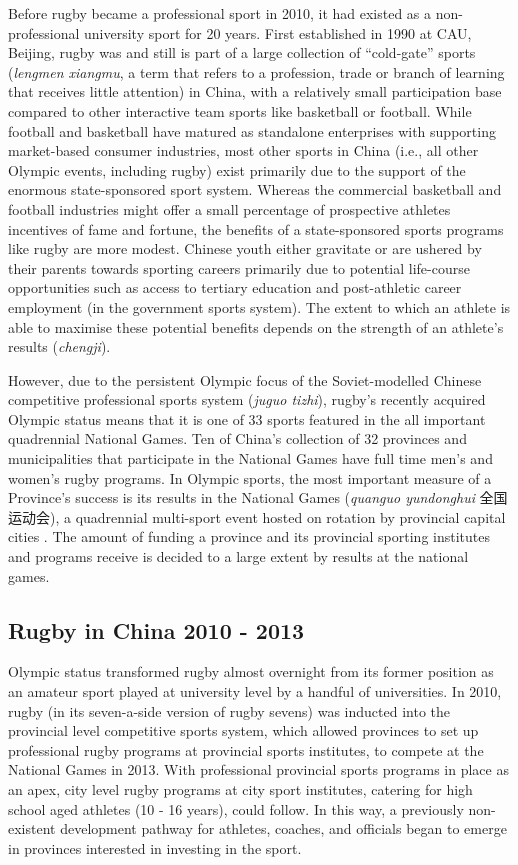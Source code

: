 {Before rugby became a professional sport in 2010, it had existed as a non-professional university sport for 20 years.  First established in 1990 at CAU, Beijing, rugby was and still is part of a large collection of ``cold-gate'' sports (\textit{lengmen xiangmu}, a term that refers to a profession, trade or branch of learning that receives little attention) in China, with a relatively small participation base compared to other interactive team sports like basketball or football.  While football and basketball have matured as standalone enterprises with supporting market-based consumer industries, most other sports in China (i.e., all other Olympic events, including rugby) exist primarily due to the support of the enormous state-sponsored sport system.  Whereas the commercial basketball and football industries might offer a small percentage of prospective athletes incentives of fame and fortune, the benefits of a state-sponsored sports programs like rugby are more modest.  Chinese youth either gravitate or are ushered by their parents towards sporting careers primarily due to potential life-course opportunities such as access to tertiary education and post-athletic career employment (in the government sports system).  The extent to which an athlete is able to maximise these potential benefits depends on the strength of an athlete's results (\textit{chengji}).

However, due to the persistent Olympic focus of the Soviet-modelled Chinese competitive professional sports system (\textit{juguo tizhi}), rugby's recently acquired Olympic status means that it is one of 33 sports featured in the all important quadrennial National Games.  Ten of China's collection of 32 provinces and municipalities that participate in the National Games have full time men's and women's rugby programs.  In Olympic sports, the most important measure of a Province's success is its results in the National Games (\textit{quanguo yundonghui} 全国运动会), a quadrennial multi-sport event hosted on rotation by provincial capital cities \citep{Hong2002}.  The amount of funding a province and its provincial sporting institutes and programs receive is decided to a large extent by results at the national games.


\subsection{Rugby in China 2010 - 2013}
Olympic status transformed rugby almost overnight from its former position as an amateur sport played at university level by a handful of universities.  In 2010, rugby (in its seven-a-side version of rugby sevens) was inducted into the provincial level competitive sports system, which allowed provinces to set up professional rugby programs at provincial sports institutes, to compete at the National Games in 2013.  With professional provincial sports programs in place as an apex, city level rugby programs at city sport institutes, catering for high school aged athletes (10 - 16 years), could follow.  In this way, a previously non-existent development pathway for athletes, coaches, and officials began to emerge in provinces interested in investing in the sport.

}
